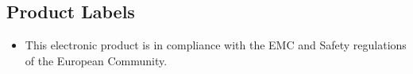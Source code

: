 

\subsection*{Product Labels}
\begin{itemize}
  \item[\CE{cerm scaled \magstep5}] This electronic product is in compliance
                                    with the EMC and Safety regulations of
                                    the European Community.
\end{itemize}










\newpage